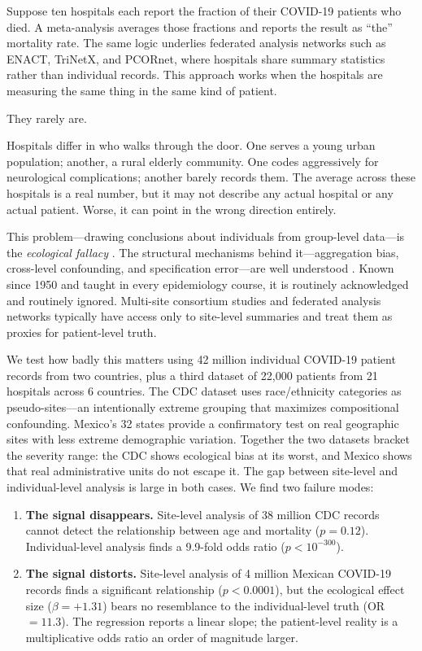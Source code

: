 \documentclass{article}
\begin{document}
Suppose ten hospitals each report the fraction of their COVID-19 patients who
died.  A meta-analysis averages those fractions and reports the result as
``the'' mortality rate.  The same logic underlies federated analysis
networks such as ENACT, TriNetX, and PCORnet, where hospitals share summary
statistics rather than individual records.  This approach works when the
hospitals are measuring the same thing in the same kind of patient.

They rarely are.

Hospitals differ in who walks through the door.  One serves a young urban
population; another, a rural elderly community.  One codes aggressively for
neurological complications; another barely records them.  The average across
these hospitals is a real number, but it may not describe any actual hospital
or any actual patient.  Worse, it can point in the wrong direction entirely.

This problem---drawing conclusions about individuals from group-level
data---is the \emph{ecological fallacy}
\cite{robinson1950ecological}.  The structural mechanisms behind it---aggregation
bias, cross-level confounding, and specification error---are well understood
\cite{greenland1992ecological,greenland2001ecologic}.
Known since 1950 and taught in every
epidemiology course, it is routinely acknowledged and routinely ignored.
Multi-site consortium studies and federated analysis networks typically have
access only to site-level summaries and treat them as proxies for
patient-level truth.

We test how badly this matters using 42 million individual COVID-19 patient
records from two countries, plus a third dataset of 22,000 patients from 21
hospitals across 6 countries.  The CDC dataset uses race/ethnicity categories
as pseudo-sites---an intentionally extreme grouping that maximizes
compositional confounding.  Mexico's 32 states provide a confirmatory test
on real geographic sites with less extreme demographic variation.  Together
the two datasets bracket the severity range: the CDC shows ecological bias
at its worst, and Mexico shows that real administrative units do not escape
it.  The gap between site-level and individual-level analysis is large in
both cases.  We find two failure modes:

\begin{enumerate}
\item \textbf{The signal disappears.}  Site-level analysis of 38 million CDC
records cannot detect the relationship between age and mortality
($p = 0.12$).  Individual-level analysis finds a 9.9-fold odds ratio
($p < 10^{-300}$).

\item \textbf{The signal distorts.}  Site-level analysis of 4 million
Mexican COVID-19 records finds a significant relationship
($p < 0.0001$), but the ecological effect size ($\beta = +1.31$) bears no
resemblance to the individual-level truth (OR $= 11.3$).  The regression
reports a linear slope; the patient-level reality is a multiplicative odds
ratio an order of magnitude larger.
\end{enumerate}
\end{document}
